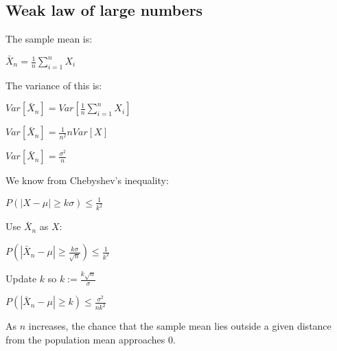 
\subsection{Weak law of large numbers}

The sample mean is:

$\bar X_n=\frac{1}{n}\sum_{i=1}^nX_i$

The variance of this is:

$Var[\bar X_n]=Var[\frac{1}{n}\sum_{i=1}^nX_i]$

$Var[\bar X_n]=\frac{1}{n^2}nVar[X]$

$Var[\bar X_n]=\frac{\sigma^2}{n} $

We know from Chebyshev’s inequality:

$P(|X-\mu | \ge k\sigma )\le \frac{1}{k^2}$

Use \(\bar X_n\) as \(X\):

$P(|\bar X_n-\mu | \ge \frac{k\sigma }{\sqrt n})\le \frac{1}{k^2}$

Update \(k\) so \(k:=\frac{k\sqrt n}{\sigma}\)

$P(|\bar X_n-\mu | \ge k)\le \frac{\sigma^2}{nk^2}$

As \(n\) increases, the chance that the sample mean lies outside a given distance from the population mean approaches \(0\).

